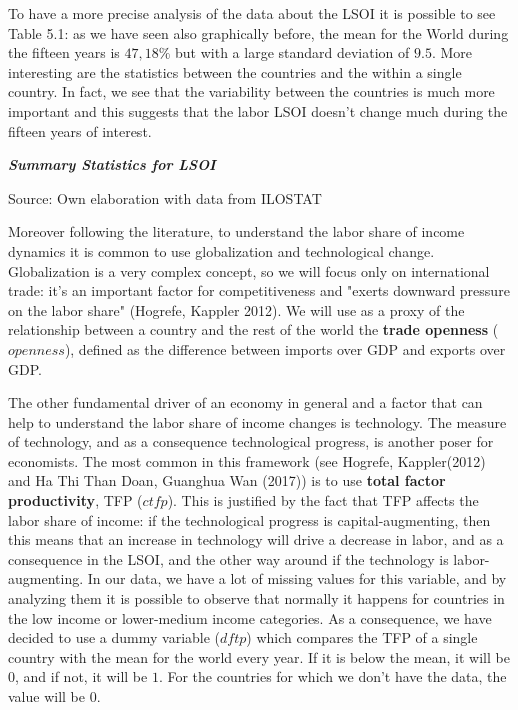 \documentclass[12pt, letterpaper]{article}
\numberwithin{table}{section}   %
\begin{document}
To have a more precise analysis of the data about the LSOI it is possible to see Table 5.1: as we have seen also graphically before, the mean for the World during the fifteen years is $47,18\%$ but with a large standard deviation of $9.5$. More interesting are the statistics between the countries and the within a single country. In fact, we see that the variability between the countries is much more important and this suggests that the labor LSOI doesn't change much during the fifteen years of interest. 

\begin{table}[htbp!]
\small
\caption{\textbf{\textit{Summary Statistics for LSOI}}} \label{tab:sumlsoi}
    \begin{center}
        
    \end{center} 
\centering\footnotesize Source: Own elaboration with data from ILOSTAT
\end{table}

Moreover following the literature, to understand the labor share of income dynamics it is common to use globalization  and technological change.
Globalization is a very complex concept, so we will focus only on international trade:  it's an important factor for competitiveness  and "exerts downward pressure on the labor share" (Hogrefe, Kappler 2012). We will use as a proxy of the relationship between a country and the rest of the world the \textbf{trade openness} ($openness$), defined as the difference between imports over GDP and exports over GDP. 

The other fundamental driver of an economy in general and a factor that can help to understand the labor share of income changes is technology. The measure of technology, and as a consequence technological progress, is another poser for economists. The most common in this framework (see Hogrefe, Kappler(2012) and Ha Thi Than Doan, Guanghua Wan (2017)) is to use \textbf{total factor productivity}, TFP ($ctfp$). This is justified by the fact that  TFP affects the labor share of income: if the technological progress is capital-augmenting, then this means that an increase in technology will drive a decrease in labor, and as a consequence in the LSOI, and the other way around if the technology is labor-augmenting. In our data, we have a lot of missing values for this variable, and by analyzing them it is possible to observe that normally it happens for countries in the low income or lower-medium income categories. As a consequence, we have decided to use a dummy variable ($dftp$) which compares the TFP of a single country with the mean for the world every year. If it is below the mean, it will be $0$, and if not, it will be $1$. For the countries for which we don't have the data, the value will be 0.
\end{document}
